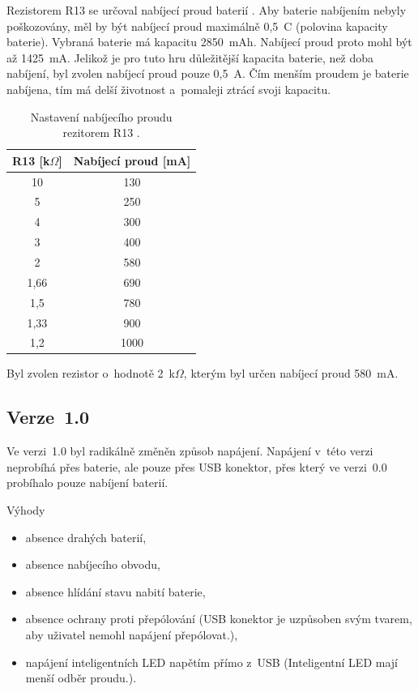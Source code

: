   Rezistorem R13 se určoval nabíjecí proud baterií \cite{TP4056_datasheet}. Aby baterie nabíjením nebyly poškozovány, měl by být nabíjecí 
  proud maximálně 0,5~C (polovina kapacity baterie). Vybraná baterie má kapacitu 2850~mAh. Nabíjecí proud proto mohl být až 1425~mA. 
  Jelikož je pro tuto hru důležitější kapacita baterie, než doba nabíjení, byl zvolen nabíjecí proud pouze 0,5~A. Čím menším proudem 
  je baterie nabíjena, tím má delší životnost a~pomaleji ztrácí svoji kapacitu.

  \begin{table}[!h]
    \caption{Nastavení nabíjecího proudu rezitorem R13 \cite{TP4056_datasheet}.}
    \begin{center}
      \begin{tabular}{|c|c|}
          \hline
          R13 [k$\Omega$] & Nabíjecí proud [mA] \\
          \hline
          10      & 130 \\
          \hline
          5       & 250 \\
          \hline
          4       & 300 \\
          \hline
          3       & 400 \\
          \hline
          2       & 580 \\
          \hline
          1,66    & 690 \\
          \hline
          1,5     & 780 \\
          \hline
          1,33    & 900 \\
          \hline
          1,2     & 1000 \\
          \hline
      \end{tabular}  
    \end{center}
  \end{table}

  Byl zvolen rezistor o~hodnotě 2~k$\Omega$, kterým byl určen nabíjecí proud 580~mA. 

  \newpage
  \subsection{Verze~1.0}
  Ve verzi~1.0 byl radikálně změněn způsob napájení. Napájení v~této verzi neprobíhá přes baterie, ale pouze přes USB konektor, přes 
  který ve verzi~0.0 probíhalo pouze nabíjení baterií. 

  Výhody
  \begin{itemize}
    \item absence drahých baterií,
    \item absence nabíjecího obvodu,
    \item absence hlídání stavu nabití baterie,
    \item absence ochrany proti přepólování (USB konektor je uzpůsoben svým tvarem, aby uživatel nemohl napájení přepólovat.),
    \item napájení inteligentních LED napětím přímo z~USB (Inteligentní LED mají menší odběr proudu.).
  \end{itemize}

